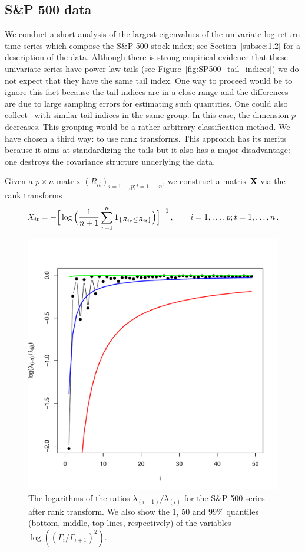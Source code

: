 \subsection{S\&P 500 data}\label{sec:sp500}
We conduct a short analysis of the largest eigenvalues of the univariate log-return time series which compose
the S\&P 500 stock index; see Section~\ref{subsec:1.2} for a description of the data.
Although there is strong empirical evidence that these univariate series have power-law tails
(see Figure~\ref{fig:SP500_tail_indices}) we  do not expect that they
have the same tail index. One way to proceed would be to ignore this fact because the tail indices are
in a close range and the differences are due to large sampling errors for estimating such quantities.  One could also collect \ts\ with similar
tail indices in the same group.
In this case, the dimension $p$ decreases. This grouping would be a rather arbitrary classification method.
We have chosen a third way: to use rank transforms.
This approach has its merits because it aims at standardizing the tails but it also has a major disadvantage: one destroys
the covariance structure underlying the data.
\par
Given a $p\times n$ matrix $(R_{it})_{i = 1, \cdots, p;t=1,\cdots, n}$,
we construct a matrix ${\mathbf X}$ via the rank transforms
\begin{equation*}
  X_{it} = -\Big[
    \log \Big(\frac{1}{n+1} \sum_{\tau=1}^n \mathbf{1}_{\{R_{i\tau} \leq R_{it}\}} \Big)
  \Big]^{-1} \,,\qquad i=1,\ldots,p;t=1,\ldots,n\,.
\end{equation*}
\begin{figure}[htb!]
  \centering
    \includegraphics[scale=0.550]{EigenRatioSP500_ranks_log_50_shown.pdf}
  \caption{The logarithms of the ratios $\lambda_{(i+1)} / \lambda_{(i)}$ for the S\&P 500 series after rank transform.
We also show the 1, 50 and 99\% quantiles (bottom, middle, top lines, respectively) of the variables
$\log((\Gamma_i/ \Gamma_{i+1})^{2})$. }
  \label{fig:EigenRatio}
\end{figure}
